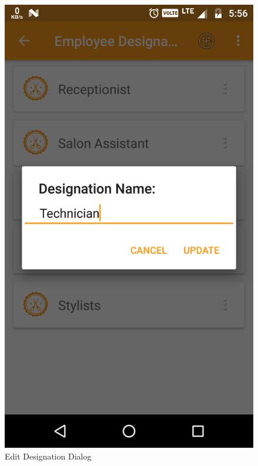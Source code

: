 \\
\begin{figure}[h]
	\centering
	\includegraphics[width=0.7\linewidth]{EditDesignationDialog}
	\caption{Edit Designation Dialog}
\end{figure}
\pagebreak

